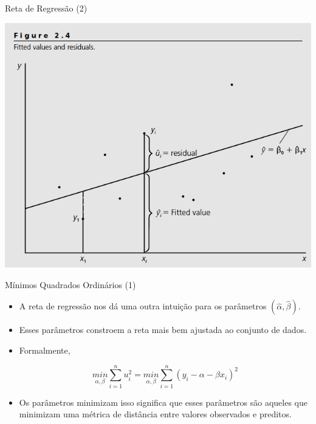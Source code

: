 \documentclass[10pt,slides,xcolor=pdftex,dvipsnames,table]{beamer}
\begin{document}

\begin{frame}{Reta de Regressão (2)}

	 \centering
    \includegraphics[height=0.8\textheight]{fig2}	
    
\end{frame}


\begin{frame}{Mínimos Quadrados Ordinários (1)}

    \begin{itemize}\itemsep1.2em
    
     \item A reta de regressão nos dá uma outra intuição para os parâmetros $(\hat{\alpha},\hat{\beta})$. 
     
     \item Esses parâmetros constroem a reta mais bem ajustada ao conjunto de dados. 
     
     \item Formalmente, 
     
      $$ \underset{\alpha,\beta}{min} \sum_{i=1}^n u_i^2 =  \underset{\alpha,\beta}{min} \sum_{i=1}^n (y_i - \alpha - \beta x_i)^2 $$
      
      \item Os parâmetros minimizam isso significa que esses parâmetros são aqueles que minimizam uma métrica de distância entre valores observados e preditos.
     
     \end{itemize}
    
\end{frame}
\end{document}
